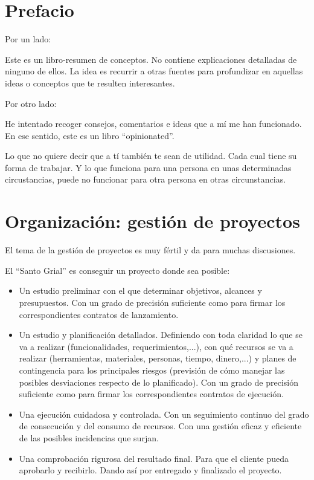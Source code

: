 \documentclass[spanish,12pt,a4paper,final,oneside]{book}
\begin{document}
\hypersetup{linkcolor=black}
\tableofcontents


\chapter*{Prefacio}


Por un lado: 

Este es un libro-resumen de conceptos. No contiene explicaciones detalladas de ninguno de ellos. La idea es recurrir a otras fuentes para profundizar en aquellas ideas o conceptos que te resulten interesantes.

\vspace{1cm}
Por otro lado:

He intentado recoger consejos, comentarios e ideas que a mí me han funcionado. En ese sentido, este es un libro ``opinionated''. 

Lo que no quiere decir que a tí también te sean de utilidad. Cada cual tiene su forma de trabajar. Y lo que funciona para una persona en unas determinadas circustancias, puede no funcionar para otra persona en otras circunstancias.



\chapter{Organización: gestión de proyectos}
El tema de la gestión de proyectos es muy fértil y da para muchas discusiones.

El ``Santo Grial'' es conseguir un proyecto donde sea posible:
\begin{itemize}
\item Un estudio preliminar con el que determinar objetivos, alcances y presupuestos. Con un grado de precisión suficiente como para firmar los correspondientes contratos de lanzamiento.
\item Un estudio y planificación detallados. Definiendo con toda claridad lo que se va a realizar (funcionalidades, requerimientos,...), con qué recursos se va a realizar (herramientas, materiales, personas, tiempo, dinero,...) y planes de contingencia para los principales riesgos (previsión de cómo manejar las posibles desviaciones respecto de lo planificado). Con un grado de precisión suficiente como para firmar los correspondientes contratos de ejecución.
\item Una ejecución cuidadosa y controlada. Con un seguimiento continuo del grado de consecución y del consumo de recursos. Con una gestión eficaz y eficiente de las posibles incidencias que surjan.
\item Una comprobación rigurosa del resultado final. Para que el cliente pueda aprobarlo y recibirlo. Dando así por entregado y finalizado el proyecto.
\end{itemize}
\end{document}
